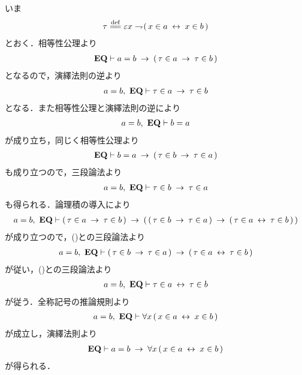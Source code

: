 	\begin{prf}
		いま
		\begin{align}
			\tau \defeq \varepsilon x \negation (\, x \in a  \lrarrow x \in b\, )
		\end{align}
		とおく．相等性公理より
		\begin{align}
			\mbox{{\bf EQ}} \vdash a = b \hspace{0.25em}\rightarrow\hspace{0.25em} (\, \tau \in a \hspace{0.25em}\rightarrow\hspace{0.25em} \tau \in b\, )
		\end{align}
		となるので，演繹法則の逆より
		\begin{align}
			a = b,\ \mbox{{\bf EQ}} \vdash \tau \in a \hspace{0.25em}\rightarrow\hspace{0.25em} \tau \in b
			\label{fom:inverse_of_axiom_of_extensionality_1}
		\end{align}
		となる．また相等性公理と演繹法則の逆により
		\begin{align}
			a = b,\ \mbox{{\bf EQ}} \vdash b = a
		\end{align}
		が成り立ち，同じく相等性公理より
		\begin{align}
			\mbox{{\bf EQ}} \vdash b = a \hspace{0.25em}\rightarrow\hspace{0.25em} (\, \tau \in b \hspace{0.25em}\rightarrow\hspace{0.25em} \tau \in a\, )
		\end{align}
		も成り立つので，三段論法より
		\begin{align}
			a = b,\ \mbox{{\bf EQ}} \vdash \tau \in b \hspace{0.25em}\rightarrow\hspace{0.25em} \tau \in a
			\label{fom:inverse_of_axiom_of_extensionality_2}
		\end{align}
		も得られる．論理積の導入により
		\begin{align}
			a = b,\ \mbox{{\bf EQ}} \vdash (\, \tau \in a \hspace{0.25em}\rightarrow\hspace{0.25em} \tau \in b\, )
			\hspace{0.25em}\rightarrow\hspace{0.25em} (\, (\, \tau \in b \hspace{0.25em}\rightarrow\hspace{0.25em} \tau \in a\, )
			\hspace{0.25em}\rightarrow\hspace{0.25em} (\, \tau \in a \hspace{0.25em}\leftrightarrow\hspace{0.25em} \tau \in b\, )\, )
		\end{align}
		が成り立つので，()との三段論法より
		\begin{align}
			a = b,\ \mbox{{\bf EQ}} \vdash (\, \tau \in b \hspace{0.25em}\rightarrow\hspace{0.25em} \tau \in a\, )
			\hspace{0.25em}\rightarrow\hspace{0.25em} (\, \tau \in a \hspace{0.25em}\leftrightarrow\hspace{0.25em} \tau \in b\, )
		\end{align}
		が従い，()との三段論法より
		\begin{align}
			a = b,\ \mbox{{\bf EQ}} \vdash \tau \in a \hspace{0.25em}\leftrightarrow\hspace{0.25em} \tau \in b
		\end{align}
		が従う．全称記号の推論規則より
		\begin{align}
			a = b,\ \mbox{{\bf EQ}} \vdash \forall x\, (\, x \in a  \hspace{0.25em}\leftrightarrow\hspace{0.25em} x \in b\, )
		\end{align}
		が成立し，演繹法則より
		\begin{align}
			\mbox{{\bf EQ}} \vdash a = b \hspace{0.25em}\rightarrow\hspace{0.25em} \forall x\, (\, x \in a  \hspace{0.25em}\leftrightarrow\hspace{0.25em} x \in b\, )
		\end{align}
		が得られる．
		\QED
	\end{prf}
	
